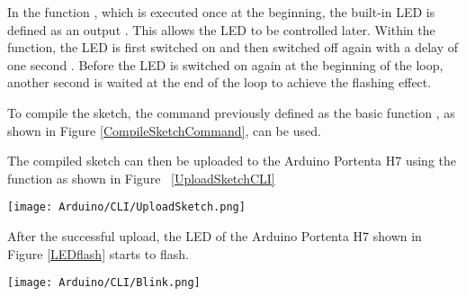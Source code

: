 \medskip

In the function , which is executed once at the beginning, the built-in LED is defined as an output . This allows the LED to be controlled later. Within the  function, the LED is first switched on  and then switched off again with a delay of one second . Before the LED is switched on again at the beginning of the loop, another second is waited at the end of the loop to achieve the flashing effect.

To compile the sketch, the command previously defined as the basic function , as shown in Figure \ref{CompileSketchCommand}, can be used.

The compiled sketch can then be uploaded to the Arduino Portenta H7 using the function  as shown in Figure ~\ref{UploadSketchCLI}


	\begin{center}
		\texttt{[image: Arduino/CLI/UploadSketch.png]}
		\label{UploadSketchCLI}
	\end{center}


After the successful upload, the LED of the Arduino Portenta H7 shown in Figure \ref{LEDflash} starts to flash.

\begin{center}
	\texttt{[image: Arduino/CLI/Blink.png]}
	\label{LEDflash}
\end{center}


